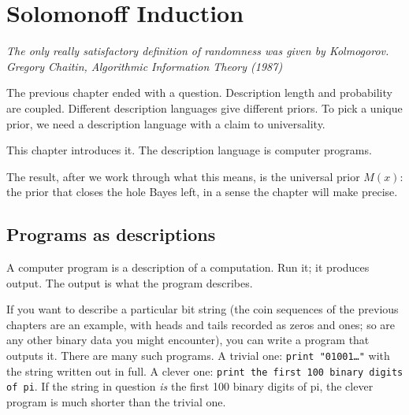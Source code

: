 \chapter{Solomonoff Induction}

\vspace{1em}
\hfill
\begin{minipage}[c]{0.55\textwidth}
\raggedleft
\small\itshape
The only really satisfactory definition of randomness was given by Kolmogorov.\\[0.5em]
\upshape\footnotesize Gregory Chaitin, \textit{Algorithmic Information Theory} (1987)
\end{minipage}%
\hspace{0.5em}
\begin{minipage}[c]{0.12\textwidth}
\end{minipage}
\vspace{1.5em}

\noindent The previous chapter ended with a question. Description length and probability are coupled. Different description languages give different priors. To pick a unique prior, we need a description language with a claim to universality.

This chapter introduces it. The description language is computer programs.

The result, after we work through what this means, is the universal prior $M(x)$: the prior that closes the hole Bayes left, in a sense the chapter will make precise.

\section*{Programs as descriptions}

A computer program is a description of a computation. Run it; it produces output. The output is what the program describes.

If you want to describe a particular bit string (the coin sequences of the previous chapters are an example, with heads and tails recorded as zeros and ones; so are any other binary data you might encounter), you can write a program that outputs it. There are many such programs. A trivial one: \texttt{print "01001\ldots"} with the string written out in full. A clever one: \texttt{print the first 100 binary digits of pi}. If the string in question \emph{is} the first 100 binary digits of pi, the clever program is much shorter than the trivial one.

